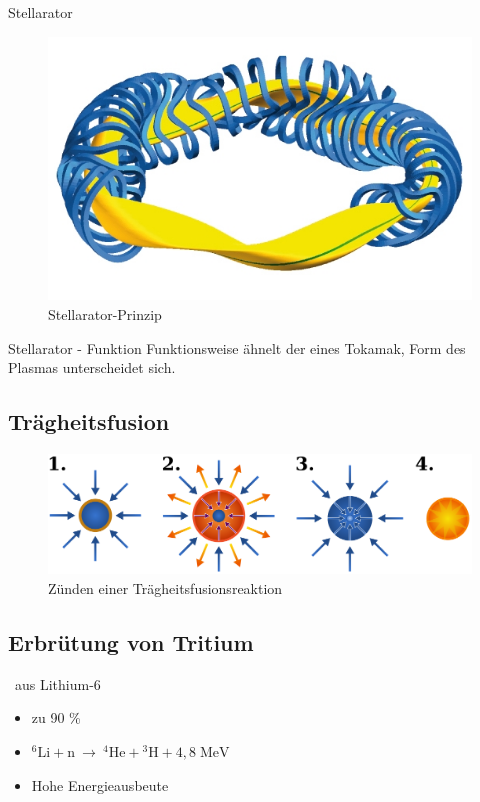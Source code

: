 \documentclass[10pt,a4paper, ngerman]{beamer}
\begin{document}
\begin{frame}{Stellarator}{\secname}
\begin{figure}
\centering
\includegraphics[width=0.75\linewidth]{stellarator1}
\caption{Stellarator-Prinzip}
\label{fig:stellarator1}
\end{figure}
\end{frame}

\begin{frame}{Stellarator - Funktion}{\secname}
Funktionsweise ähnelt der eines Tokamak, Form des Plasmas unterscheidet sich.
\end{frame}

\subsection{Trägheitsfusion}
\begin{frame}{\subsecname}{\secname}
\begin{figure}
\centering
\includegraphics[width=\linewidth]{traegheitsfusion}
\caption{Zünden einer Trägheitsfusionsreaktion}
\label{fig:traegheitsfusion}
\end{figure}
\end{frame}

\subsection{Erbrütung von Tritium}
\begin{frame}{\subsecname \ aus Lithium-6}{\secname}
\begin{itemize}
\item zu 90 \% 
\item \(^{6}{\mathrm  {Li}}+{\mathrm  {n}}\ \rightarrow \ ^{4}{\mathrm  {He}}+{}^{3}{\mathrm  {H}}+4{,}8\;{\mathrm  {MeV}}\)
\item Hohe Energieausbeute
\end{itemize}
\end{frame}
\end{document}
